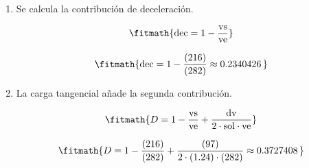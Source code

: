 \begin{enumerate}

\item Se calcula la contribución de deceleración.

\[\fitmath{\mathrm{dec}=1-\frac{\mathrm{vs}}{\mathrm{ve}}}\]

\[\fitmath{\mathrm{dec}=1-\frac{(216)}{(282)}\approx 0.2340426\,}\]

\item La carga tangencial añade la segunda contribución.

\[\fitmath{D=1-\frac{\mathrm{vs}}{\mathrm{ve}}+\frac{\mathrm{dv}}{2\cdot \mathrm{sol}\cdot \mathrm{ve}}}\]

\[\fitmath{D=1-\frac{(216)}{(282)}+\frac{(97)}{2\cdot (1.24)\cdot (282)}\approx 0.3727408\,}\]

\end{enumerate}
